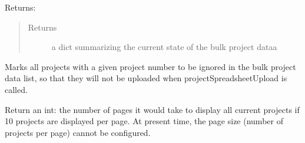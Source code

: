 \documentclass[letterpaper,10pt,english]{sphinxmanual}
\begin{document}
\begin{fulllineitems}
\begin{fulllineitems}
Returns:

\begin{sphinxVerbatim}[commandchars=\\\{\}]
         
         
         
\end{sphinxVerbatim}
\begin{quote}\begin{description}
\item[{Returns}] \leavevmode
a dict summarizing the current state of the bulk project dataa

\end{description}\end{quote}

\end{fulllineitems}


\begin{fulllineitems}
\label{\detokenize{apidoc/utdesign_procurement:utdesign_procurement.apigateway.ApiGateway.projectSpreadsheetOverwrite}}
Marks all projects with a given project number to be ignored in
the bulk project data list, so that they will not be uploaded
when projectSpreadsheetUpload is called.

\end{fulllineitems}


\begin{fulllineitems}
\label{\detokenize{apidoc/utdesign_procurement:utdesign_procurement.apigateway.ApiGateway.projectSpreadsheetPages}}
Return an int: the number of pages it would take to
display all current projects if 10 projects are displayed
per page. At present time, the page size (number of
projects per page) cannot be configured.


\end{fulllineitems}
\end{fulllineitems}
\end{document}
